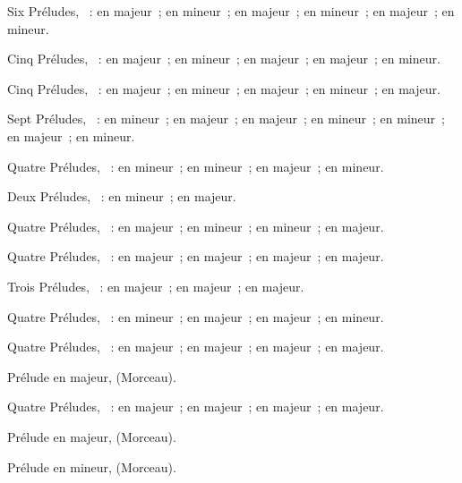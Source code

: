 Six Préludes, ~:  en \kC majeur~;  en \kA
mineur~;  en \kG majeur~;  en \kE mineur~;  en
\kD majeur~;  en \kB mineur.

Cinq Préludes, ~:  en \kA majeur~;  en \kF
\Sharp mineur~;  en \kE majeur~;  en \kE majeur~;
 en \kC \Sharp mineur.

Cinq Préludes, ~:  en \kB majeur~;  en \kG
\Sharp mineur~;  en \kG \Flat majeur~;  en \kE \Flat
mineur~;  en \kF \Sharp majeur.

Sept Préludes, ~:  en \kD mineur~;  en \kE
\Flat majeur~;  en \kD \Flat majeur~;  en \kB \Flat
mineur~;  en \kF mineur~;  en \kB \Flat majeur~;
 en \kG mineur.

Quatre Préludes, ~:  en \kG \Sharp mineur~;  en
\kC \Sharp mineur~;  en \kB majeur~;  en \kB mineur.

Deux Préludes, ~:  en \kG mineur~;  en \kB
majeur.

Quatre Préludes, ~:  en \kD \Flat majeur~;  en
\kF \Sharp mineur~;  en \kE \Flat mineur~;  en \kC
majeur.

Quatre Préludes, ~:  en \kE majeur~;  en \kF
\Sharp majeur~;  en \kC majeur~;  en \kA \Flat majeur.

Trois Préludes, ~:  en \kD \Flat majeur~;  en
\kB \Flat majeur~;  en \kC majeur.

Quatre Préludes, ~:  en \kB \Flat mineur~;  en
\kF \Sharp majeur~;  en \kB majeur~;  en \kG mineur.

Quatre Préludes, ~:  en \kF \Sharp majeur~;  en
\kD majeur~;  en \kG majeur~;  en \kA \Flat majeur.

Prélude en \kE \Flat majeur,   (Morceau).

Quatre Préludes, ~:  en \kF \Sharp majeur~;  en
\kC majeur~;  en \kD \Flat majeur~;  en \kC majeur.

Prélude en \kF majeur,   (Morceau).

Prélude en \kA mineur,   (Morceau).

